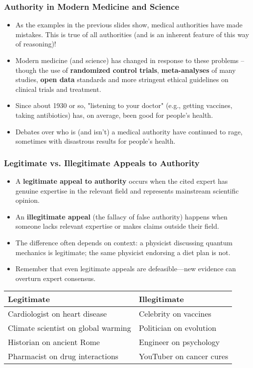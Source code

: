 \documentclass{beamer}
\begin{document}
	\begin{frame}
		\frametitle{Authority in Modern Medicine and Science}
		\begin{itemize}
			\item As the examples in the previous slides show, medical authorities have made mistakes. This is true of all authorities (and is an inherent feature of this way of reasoning)!
			\item Modern medicine (and science) has changed in response to these problems -- though the use of \textbf{randomized control trials}, \textbf{meta-analyses} of many studies, \textbf{open data} standards and more stringent ethical guidelines on clinical trials and treatment.
			\item Since about 1930 or so, "listening to your doctor" (e.g., getting vaccines, taking antibiotics) has, on average, been good for people's health. 
			\item Debates over who is (and isn't) a medical authority have continued to rage, sometimes with disastrous results for people's health.
		\end{itemize}
		
	\end{frame}
	
	\begin{frame}
		\frametitle{Legitimate vs. Illegitimate Appeals to Authority}
		\begin{itemize}
			\item A \textbf{legitimate appeal to authority} occurs when the cited expert has genuine expertise in the relevant field and represents mainstream scientific opinion.
			\item An \textbf{illegitimate appeal} (the fallacy of false authority) happens when someone lacks relevant expertise or makes claims outside their field.
			\item The difference often depends on context: a physicist discussing quantum mechanics is legitimate; the same physicist endorsing a diet plan is not.
			\item Remember that even legitimate appeals are defeasible—new evidence can overturn expert consensus.
		\end{itemize}
		
		\begin{table}
			\centering
			\scriptsize
			\begin{tabular}{|p{4cm}|p{4cm}|}
				\hline
				\textbf{Legitimate} & \textbf{Illegitimate} \\
				\hline
				Cardiologist on heart disease & Celebrity on vaccines \\
				Climate scientist on global warming & Politician on evolution \\
				Historian on ancient Rome & Engineer on psychology \\
				Pharmacist on drug interactions & YouTuber on cancer cures \\
				\hline
			\end{tabular}
		\end{table}
	\end{frame}
	
\end{document}
